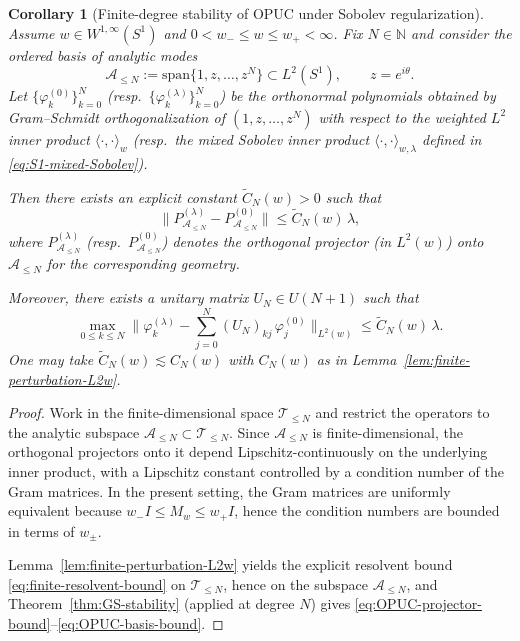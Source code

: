 \documentclass{amsart}
\numberwithin{equation}{section}
\newtheorem{corollary}[theorem]{Corollary}
\theoremstyle{definition}
\theoremstyle{remark}
\begin{document}
\begin{corollary}[Finite-degree stability of OPUC under Sobolev regularization]
\label{cor:OPUC-Sobolev-stability}
Assume $w\in W^{1,\infty}(S^1)$ and $0<w_-\le w\le w_+<\infty$.
Fix $N\in\mathbb N$ and consider the ordered basis of analytic modes
\[
\mathcal A_{\le N}:=\mathrm{span}\{1,z,\dots,z^N\}\subset L^2(S^1),
\qquad z=e^{i\theta}.
\]
Let $\{\varphi^{(0)}_k\}_{k=0}^N$ (resp.\ $\{\varphi^{(\lambda)}_k\}_{k=0}^N$)
be the orthonormal polynomials obtained by Gram--Schmidt orthogonalization of
$(1,z,\dots,z^N)$ with respect to the weighted $L^2$ inner product
$\langle\cdot,\cdot \rangle_w$ (resp.\ the mixed Sobolev inner product
$\langle\cdot,\cdot \rangle_{w,\lambda}$ defined in \eqref{eq:S1-mixed-Sobolev}).

Then there exists an explicit constant $\widetilde C_N(w)>0$ such that
\begin{equation}\label{eq:OPUC-projector-bound}
\big\|P_{\mathcal A_{\le N}}^{(\lambda)}-P_{\mathcal A_{\le N}}^{(0)}\big\|
\le \widetilde C_N(w)\,\lambda,
\end{equation}
where $P_{\mathcal A_{\le N}}^{(\lambda)}$ (resp.\ $P_{\mathcal A_{\le N}}^{(0)}$)
denotes the orthogonal projector (in $L^2(w)$) onto $\mathcal A_{\le N}$
for the corresponding geometry.

Moreover, there exists a unitary matrix $U_N\in U(N+1)$ such that
\begin{equation}\label{eq:OPUC-basis-bound}
\max_{0\le k\le N}
\Big\|
\varphi^{(\lambda)}_k-\sum_{j=0}^N (U_N)_{kj}\,\varphi^{(0)}_j
\Big\|_{L^2(w)}
\le \widetilde C_N(w)\,\lambda.
\end{equation}
One may take $\widetilde C_N(w)\lesssim C_N(w)$ with $C_N(w)$ as in
Lemma~\ref{lem:finite-perturbation-L2w}.
\end{corollary}

\begin{proof}
Work in the finite-dimensional space $\mathcal T_{\le N}$ and restrict the operators to the
analytic subspace $\mathcal A_{\le N}\subset \mathcal T_{\le N}$.
Since $\mathcal A_{\le N}$ is finite-dimensional, the orthogonal projectors onto it depend
Lipschitz-continuously on the underlying inner product, with a Lipschitz constant controlled by
a condition number of the Gram matrices. In the present setting, the Gram matrices are uniformly
equivalent because $w_- I\le M_w\le w_+I$, hence the condition numbers are bounded in terms of $w_\pm$.

Lemma~\ref{lem:finite-perturbation-L2w} yields the explicit resolvent bound
\eqref{eq:finite-resolvent-bound} on $\mathcal T_{\le N}$, hence on the subspace
$\mathcal A_{\le N}$, and Theorem~\ref{thm:GS-stability} (applied at degree $N$)
gives \eqref{eq:OPUC-projector-bound}--\eqref{eq:OPUC-basis-bound}.
\end{proof}
\end{document}
